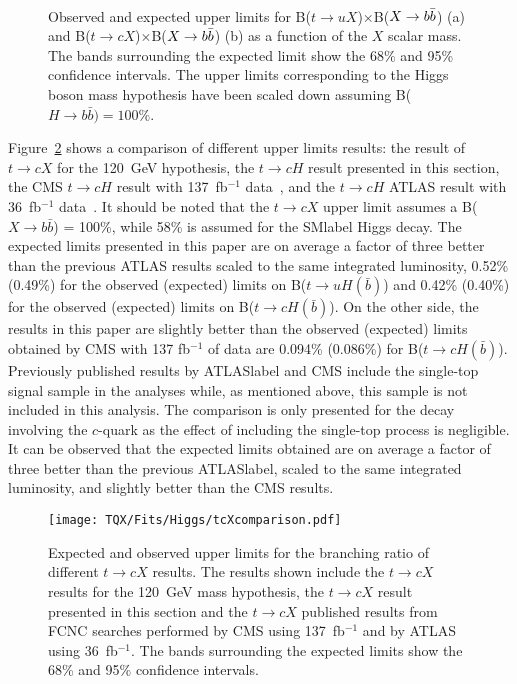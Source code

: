 \begin{figure}[htb]
    \RawFloats
    \centering
    \\
    \caption{Observed and expected upper limits for B($t\to uX$)$\times$B($X\to b\bar{b}$) (a) and B($t\to cX$)$\times$B($X\to b\bar{b}$) (b) as a function of the $X$ scalar mass. The bands surrounding the expected limit show the 68\% and 95\% confidence intervals. The upper limits corresponding to the Higgs boson mass hypothesis have been scaled down assuming B($H \rightarrow b \bar{b}) = 100\%$.}
    \label{tqX:limitIncH}
\end{figure}

Figure~\ref{tqX:cHlimitcomparison} shows a comparison of different upper limits results: the result of $t\to cX$ for the 120~GeV hypothesis, the $t\to cH$ result presented in this section, the CMS $t\to cH$ result with 137~fb$^{-1}$ data~\cite{CMStqHRun2}, and the $t\to cH$ ATLAS result with 36~fb$^{-1}$ data~\cite{TOPQ-2017-07}. It should be noted that the $t\to cX$ upper limit assumes a B($X\rightarrow b \bar{b}$) = 100\%, while 58\% is assumed for the \acrshort{SMlabel} Higgs decay. The expected limits presented in this paper are on average a factor of three better than the previous ATLAS results scaled to the same integrated luminosity, 0.52\% (0.49\%) for the observed (expected) limits on B($t\rightarrow uH(\bar{b})$) and 0.42\% (0.40\%) for the observed (expected) limits on B($t\rightarrow cH(\bar{b})$). On the other side, the results in this paper are slightly better than the observed (expected) limits obtained by CMS with 137 fb$^{-1}$ of data are 0.094\% (0.086\%) for B($t\rightarrow cH(\bar{b})$).\\

Previously published results by \acrshort{ATLASlabel} and CMS include the single-top signal sample in the analyses while, as mentioned above, this sample is not included in this analysis. The comparison is only presented for the decay involving the $c$-quark as the effect of including the single-top process is negligible. It can be observed that the expected limits obtained are on average a factor of three better than the previous \acrshort{ATLASlabel}, scaled to the same integrated luminosity, and slightly better than the CMS results.

\begin{figure}[htb]
    \RawFloats
    \centering
    \texttt{[image: TQX/Fits/Higgs/tcXcomparison.pdf]}
    \caption{Expected and observed upper limits for the branching ratio of different $t\to cX$ results. The results shown include the $t\to cX$ results for the 120~GeV mass hypothesis, the $t\to cX$ result presented in this section and the $t\to cX$ published results from FCNC searches performed by CMS using 137~fb$^{-1}$ and by ATLAS using 36~fb$^{-1}$. The bands surrounding the expected limits show the 68\% and 95\% confidence intervals.}
    \label{tqX:cHlimitcomparison}
\end{figure}


